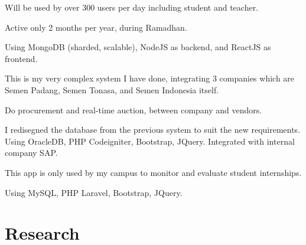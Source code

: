 \documentclass[letterpaper]{deedy-resume} %
\begin{document}
\begin{minipage}[t]{0.66\textwidth}


\begin{tightitemize}
\item Will be used by over 300 users per day including student and teacher.
\item Active only 2 months per year, during Ramadhan.
\item Using MongoDB (sharded, scalable), NodeJS as backend, and ReactJS as frontend.
\end{tightitemize}
\sectionspace



\begin{tightitemize}
\item This is my very complex system I have done, integrating 3 companies which are Semen Padang, Semen Tonasa, and Semen Indonesia itself.
\item Do procurement and real-time auction, between company and vendors.
\item I redisegned the database from the previous system to suit the new requirements. Using OracleDB, PHP Codeigniter, Bootstrap, JQuery. Integrated with internal company SAP.
\end{tightitemize}
\sectionspace



\begin{tightitemize}
\item This app is only used by my campus to monitor and evaluate student internships.
\item Using MySQL, PHP Laravel, Bootstrap, JQuery.
\end{tightitemize}
\sectionspace


\section{Research}


\end{minipage}
\end{document}

